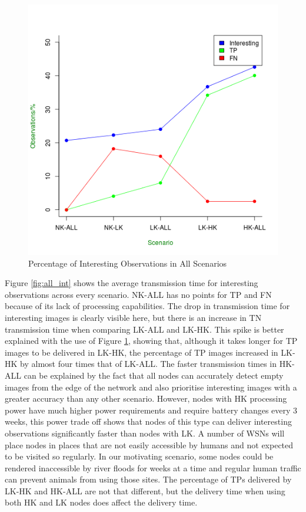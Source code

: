\begin{figure}[!h]
\centering
\includegraphics[width=\textwidth]{Chap7/figures/all_int_percent.png}
\caption{Percentage of Interesting Observations in All Scenarios}
\label{fig:all_int_percent}
\end{figure}

Figure \ref{fig:all_int} shows the average transmission time for interesting observations across every scenario. NK-ALL has no points for TP and FN because of its lack of processing capabilities. The drop in transmission time for interesting images is clearly visible here, but there is an increase in TN transmission time when comparing LK-ALL and LK-HK. This spike is better explained with the use of Figure \ref{fig:all_int_percent}, showing that, although it takes longer for TP images to be delivered in LK-HK, the percentage of TP images increased in LK-HK by almost four times that of LK-ALL. The faster transmission times in HK-ALL can be explained by the fact that all nodes can accurately detect empty images from the edge of the network and also prioritise interesting images with a greater accuracy than any other scenario. However, nodes with HK processing power have much higher power requirements and require battery changes every 3 weeks, this power trade off shows that nodes of this type can deliver interesting observations significantly faster than nodes with LK. A number of WSNs will place nodes in places that are not easily accessible by humans and not expected to be visited so regularly. In our motivating scenario, some nodes could be rendered inaccessible by river floods for weeks at a time and regular human traffic can prevent animals from using those sites. The percentage of TPs delivered by LK-HK and HK-ALL are not that different, but the delivery time when using both HK and LK nodes does affect the delivery time. 

